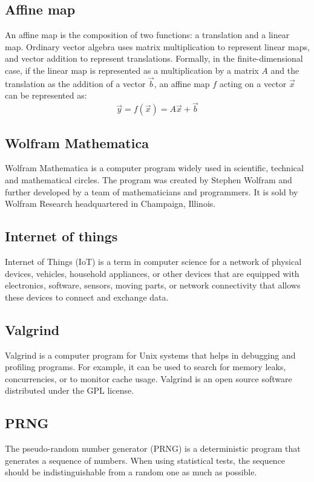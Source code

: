 \documentclass[thesis=M,english]{FITthesis}[2019/12/23]
\begin{document}
\subsection{Affine map}
An affine map is the composition of two functions: a translation and a linear map. Ordinary vector algebra uses matrix multiplication to represent linear maps, and vector addition to represent translations. Formally, in the finite-dimensional case, if the linear map is represented as a multiplication by a matrix $A$ and the translation as the addition of a vector $\vec {b}$, an affine map $f$ acting on a vector ${\vec {x}}$ can be represented as:
\[
{\vec {y}}=f({\vec {x}})=A{\vec {x}}+{\vec {b}}
\]

\subsection{Wolfram Mathematica}
Wolfram Mathematica is a computer program widely used in scientific, technical and mathematical circles. The program was created by Stephen Wolfram and further developed by a team of mathematicians and programmers. It is sold by Wolfram Research headquartered in Champaign, Illinois.

\subsection{Internet of things}
Internet of Things (IoT) is a term in computer science for a network of physical devices, vehicles, household appliances, or other devices that are equipped with electronics, software, sensors, moving parts, or network connectivity that allows these devices to connect and exchange data.

\subsection{Valgrind}
Valgrind is a computer program for Unix systems that helps in debugging and profiling programs. For example, it can be used to search for memory leaks, concurrencies, or to monitor cache usage. Valgrind is an open source software distributed under the GPL license.

\subsection{PRNG}
The pseudo-random number generator (PRNG) is a deterministic program that generates a sequence of numbers. When using statistical tests, the sequence should be indistinguishable from a random one as much as possible.
\end{document}
